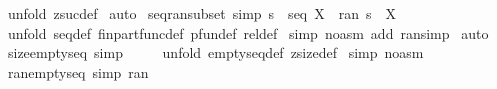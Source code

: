 \begin{isabellebody}
%
\isatagproof
{}\isamarkupfalse%
\ {\isacharparenleft}unfold\ zsuc{\isacharunderscore}def{\isacharparenright}\isanewline
{}\isamarkupfalse%
\ auto\isanewline
{}\isamarkupfalse%
%
\endisatagproof
{\isafoldproof}%
%
\isadelimproof
%
\endisadelimproof
%
\isamarkuptrue%
\isamarkupfalse%
\ seq{\isacharunderscore}ran{\isacharunderscore}subset\ {\isacharbrackleft}simp{\isacharbrackright}{\isacharcolon}\ {\isachardoublequoteopen}{\isacharparenleft}s\ {\isacharcolon}\ seq\ X{\isacharparenright}\ {\isacharequal}{\isacharequal}{\isachargreater}\ {\isacharparenleft}ran\ s\ {\isacharless}{\isacharequal}\ X{\isacharparenright}{\isachardoublequoteclose}\isanewline
%
\isadelimproof
%
\endisadelimproof
%
\isatagproof
{}\isamarkupfalse%
\ {\isacharparenleft}unfold\ seq{\isacharunderscore}def\ fin{\isacharunderscore}part{\isacharunderscore}func{\isacharunderscore}def\ pfun{\isacharunderscore}def\ rel{\isacharunderscore}def{\isacharparenright}\isanewline
{}\isamarkupfalse%
\ {\isacharparenleft}simp\ {\isacharparenleft}no{\isacharunderscore}asm{\isacharparenright}\ add{\isacharcolon}\ ran{\isacharunderscore}simp{\isacharparenright}\isanewline
{}\isamarkupfalse%
\ auto\isanewline
{}\isamarkupfalse%
%
\endisatagproof
{\isafoldproof}%
%
\isadelimproof
\isanewline
%
\endisadelimproof
\isanewline
{}\isamarkupfalse%
\ size{\isacharunderscore}emptyseq\ {\isacharbrackleft}simp{\isacharbrackright}{\isacharcolon}\ {\isachardoublequoteopen}{\isacharhash}\ {\isacharpercent}{\isacharless}{\isacharpercent}{\isachargreater}\ {\isacharequal}\ {}{\isachardoublequoteclose}\isanewline
%
\isadelimproof
%
\endisadelimproof
%
\isatagproof
{}\isamarkupfalse%
\ {\isacharparenleft}unfold\ emptyseq{\isacharunderscore}def\ zsize{\isacharunderscore}def{\isacharparenright}\isanewline
{}\isamarkupfalse%
\ {\isacharparenleft}simp\ {\isacharparenleft}no{\isacharunderscore}asm{\isacharparenright}{\isacharparenright}\isanewline
{}\isamarkupfalse%
%
\endisatagproof
{\isafoldproof}%
%
\isadelimproof
\isanewline
%
\endisadelimproof
\isanewline
\isanewline
{}\isamarkupfalse%
\ ran{\isacharunderscore}emptyseq\ {\isacharbrackleft}simp{\isacharbrackright}{\isacharcolon}\ {\isachardoublequoteopen}ran\ {\isacharparenleft}{\isacharpercent}{\isacharless}{\isacharpercent}{\isachargreater}{\isacharparenright}\ {\isacharequal}\ {\isacharbraceleft}{\isacharbraceright}{\isachardoublequoteclose}\isanewline

\end{isabellebody}
